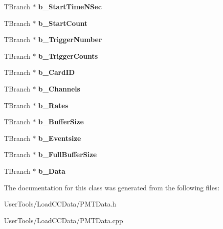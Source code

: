\begin{DoxyCompactItemize}
\item 
\hypertarget{classPMTData_adf7cd7729bb5bba9ad630deb52f59946}{
TBranch $\ast$ {\bfseries b\_\-StartTimeNSec}}
\label{classPMTData_adf7cd7729bb5bba9ad630deb52f59946}

\item 
\hypertarget{classPMTData_a76e691f68bd678cfcee9abd08ac96ed6}{
TBranch $\ast$ {\bfseries b\_\-StartCount}}
\label{classPMTData_a76e691f68bd678cfcee9abd08ac96ed6}

\item 
\hypertarget{classPMTData_a086214097320d5797cc153f1b27f0bef}{
TBranch $\ast$ {\bfseries b\_\-TriggerNumber}}
\label{classPMTData_a086214097320d5797cc153f1b27f0bef}

\item 
\hypertarget{classPMTData_a9265633fa545a406faeda273716b3e11}{
TBranch $\ast$ {\bfseries b\_\-TriggerCounts}}
\label{classPMTData_a9265633fa545a406faeda273716b3e11}

\item 
\hypertarget{classPMTData_a6f2ac15158ae8a458f56cce652ea9f6d}{
TBranch $\ast$ {\bfseries b\_\-CardID}}
\label{classPMTData_a6f2ac15158ae8a458f56cce652ea9f6d}

\item 
\hypertarget{classPMTData_ac08cb29ec61c1d945fbf6893c2f80b90}{
TBranch $\ast$ {\bfseries b\_\-Channels}}
\label{classPMTData_ac08cb29ec61c1d945fbf6893c2f80b90}

\item 
\hypertarget{classPMTData_a29343471536481bcfa94d746958018d2}{
TBranch $\ast$ {\bfseries b\_\-Rates}}
\label{classPMTData_a29343471536481bcfa94d746958018d2}

\item 
\hypertarget{classPMTData_a4df357ba10b131aa5a2886ccf08899fa}{
TBranch $\ast$ {\bfseries b\_\-BufferSize}}
\label{classPMTData_a4df357ba10b131aa5a2886ccf08899fa}

\item 
\hypertarget{classPMTData_a66261088f4371dc96d62f508178e6a91}{
TBranch $\ast$ {\bfseries b\_\-Eventsize}}
\label{classPMTData_a66261088f4371dc96d62f508178e6a91}

\item 
\hypertarget{classPMTData_a26d8366646579d0a26a951c9bde9a6b0}{
TBranch $\ast$ {\bfseries b\_\-FullBufferSize}}
\label{classPMTData_a26d8366646579d0a26a951c9bde9a6b0}

\item 
\hypertarget{classPMTData_a19565c90684786dc6221282ba7e1305c}{
TBranch $\ast$ {\bfseries b\_\-Data}}
\label{classPMTData_a19565c90684786dc6221282ba7e1305c}

\end{DoxyCompactItemize}


The documentation for this class was generated from the following files:\begin{DoxyCompactItemize}
\item 
UserTools/LoadCCData/PMTData.h\item 
UserTools/LoadCCData/PMTData.cpp\end{DoxyCompactItemize}

